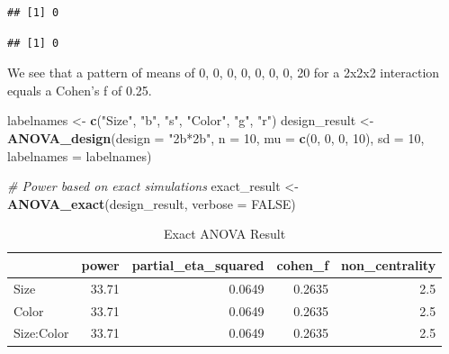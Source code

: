 \documentclass[]{book}
\newenvironment{Shaded}{\begin{snugshade}}{\end{snugshade}}
\newcommand{\CommentTok}[1]{\textcolor[rgb]{0.56,0.35,0.01}{\textit{#1}}}
\newcommand{\DataTypeTok}[1]{\textcolor[rgb]{0.13,0.29,0.53}{#1}}
\newcommand{\DecValTok}[1]{\textcolor[rgb]{0.00,0.00,0.81}{#1}}
\newcommand{\KeywordTok}[1]{\textcolor[rgb]{0.13,0.29,0.53}{\textbf{#1}}}
\newcommand{\NormalTok}[1]{#1}
\newcommand{\OperatorTok}[1]{\textcolor[rgb]{0.81,0.36,0.00}{\textbf{#1}}}
\newcommand{\OtherTok}[1]{\textcolor[rgb]{0.56,0.35,0.01}{#1}}
\newcommand{\StringTok}[1]{\textcolor[rgb]{0.31,0.60,0.02}{#1}}
\begin{document}
\begin{Shaded}
\end{Shaded}

\begin{verbatim}
## [1] 0
\end{verbatim}

\begin{Shaded}
\end{Shaded}

\begin{verbatim}
## [1] 0
\end{verbatim}

We see that a pattern of means of 0, 0, 0, 0, 0, 0, 0, 20 for a 2x2x2 interaction equals a Cohen's f of 0.25.

\begin{Shaded}
\begin{Highlighting}[]
\NormalTok{labelnames <-}\StringTok{ }\KeywordTok{c}\NormalTok{(}\StringTok{"Size"}\NormalTok{, }\StringTok{"b"}\NormalTok{, }\StringTok{"s"}\NormalTok{, }\StringTok{"Color"}\NormalTok{, }\StringTok{"g"}\NormalTok{, }\StringTok{"r"}\NormalTok{)}
\NormalTok{design_result <-}\StringTok{ }\KeywordTok{ANOVA_design}\NormalTok{(}\DataTypeTok{design =} \StringTok{"2b*2b"}\NormalTok{, }
                              \DataTypeTok{n =} \DecValTok{10}\NormalTok{, }
                              \DataTypeTok{mu =} \KeywordTok{c}\NormalTok{(}\DecValTok{0}\NormalTok{, }\DecValTok{0}\NormalTok{, }\DecValTok{0}\NormalTok{, }\DecValTok{10}\NormalTok{), }
                              \DataTypeTok{sd =} \DecValTok{10}\NormalTok{, }
                              \DataTypeTok{labelnames =}\NormalTok{ labelnames) }

\CommentTok{# Power based on exact simulations}
\NormalTok{exact_result <-}\StringTok{ }\KeywordTok{ANOVA_exact}\NormalTok{(design_result,}
                            \DataTypeTok{verbose =} \OtherTok{FALSE}\NormalTok{)}
\end{Highlighting}
\end{Shaded}

\begin{table}[!h]

\caption{\label{tab:unnamed-chunk-209}Exact ANOVA Result}
\centering
\begin{tabular}{l|r|r|r|r}
\hline
  & power & partial\_eta\_squared & cohen\_f & non\_centrality\\
\hline
Size & 33.71 & 0.0649 & 0.2635 & 2.5\\
\hline
Color & 33.71 & 0.0649 & 0.2635 & 2.5\\
\hline
Size:Color & 33.71 & 0.0649 & 0.2635 & 2.5\\
\hline
\end{tabular}
\end{table}
\end{document}
